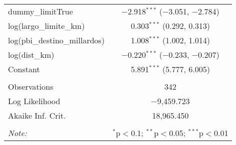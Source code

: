 \begin{table}[H]
\begin{tabular}{@{\extracolsep{5pt}}lc}
  dummy\_limitTrue & $-$2.918$^{***}$ ($-$3.051, $-$2.784) \\ 
  log(largo\_limite\_km) & 0.303$^{***}$ (0.292, 0.313) \\ 
  log(pbi\_destino\_millardos) & 1.008$^{***}$ (1.002, 1.014) \\ 
  log(dist\_km) & $-$0.220$^{***}$ ($-$0.233, $-$0.207) \\ 
  Constant & 5.891$^{***}$ (5.777, 6.005) \\ 
 \hline \\[-1.8ex] 
Observations & 342 \\ 
Log Likelihood & $-$9,459.723 \\ 
Akaike Inf. Crit. & 18,965.450 \\ 
\hline 
\hline \\[-1.8ex] 
\textit{Note:}  & \multicolumn{1}{r}{$^{*}$p$<$0.1; $^{**}$p$<$0.05; $^{***}$p$<$0.01} \\ 
\end{tabular} 
\end{table} 
